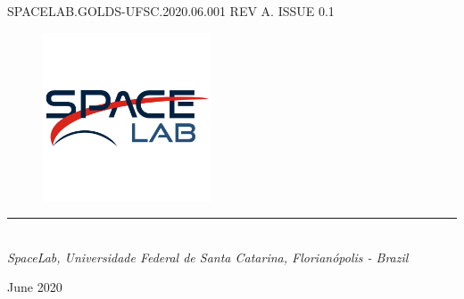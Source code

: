 %
%
%
%
%

%
%
%
%
%
%

\begin{titlepage}

\thispagestyle{empty}

\begin{flushleft}
SPACELAB.GOLDS-UFSC.2020.06.001 REV A. ISSUE 0.1
\end{flushleft}

\begin{figure}[!ht]
    \begin{flushleft}
        \includegraphics[width=5cm]{figures/spacelab.png}
    \end{flushleft}
\end{figure}

\begin{flushleft}
\Huge{\textbf{\thetitle}}
\rule[0pt]{\textwidth}{5pt}
\end{flushleft}

\vspace{0.2cm}

\begin{flushleft}
\textit{\thetitle} \\
\textit{SpaceLab, Universidade Federal de Santa Catarina, Florianópolis - Brazil}
\end{flushleft}

\vfill
\vfill

\begin{flushright}
June 2020
\end{flushright}

\end{titlepage}

